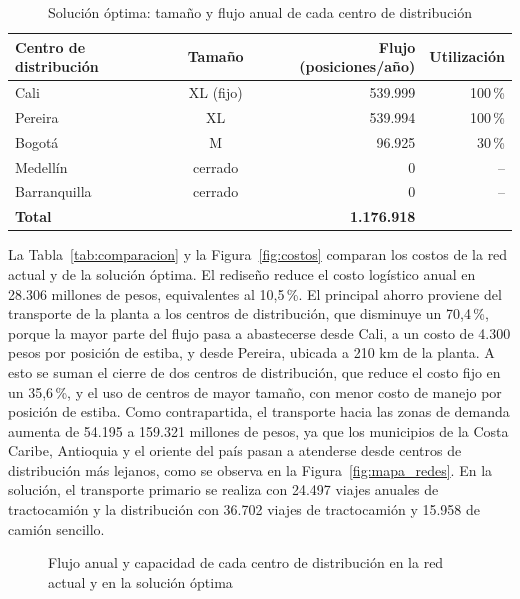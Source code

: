 \documentclass[fleqn, 11pt,letterpaper]{article}
\begin{document}
\begin{table}[H]
\centering
\caption{Solución óptima: tamaño y flujo anual de cada centro de distribución}
\label{tab:solucion_cedi}
\begin{tabular}{lcrr}
\toprule
\textbf{Centro de distribución} & \textbf{Tamaño} & \textbf{Flujo (posiciones/año)} & \textbf{Utilización} \\
\midrule
Cali         & XL (fijo) & 539.999 & 100\,\% \\
Pereira      & XL        & 539.994 & 100\,\% \\
Bogotá       & M         &  96.925 &  30\,\% \\
Medellín     & cerrado   &       0 & -- \\
Barranquilla & cerrado   &       0 & -- \\
\midrule
\textbf{Total} & & \textbf{1.176.918} & \\
\bottomrule
\end{tabular}
\end{table}

La Tabla~\ref{tab:comparacion} y la Figura~\ref{fig:costos} comparan los costos de la red actual y de la solución óptima. El rediseño reduce el costo logístico anual en 28.306 millones de pesos, equivalentes al 10,5\,\%. El principal ahorro proviene del transporte de la planta a los centros de distribución, que disminuye un 70,4\,\%, porque la mayor parte del flujo pasa a abastecerse desde Cali, a un costo de 4.300 pesos por posición de estiba, y desde Pereira, ubicada a 210 km de la planta. A esto se suman el cierre de dos centros de distribución, que reduce el costo fijo en un 35,6\,\%, y el uso de centros de mayor tamaño, con menor costo de manejo por posición de estiba. Como contrapartida, el transporte hacia las zonas de demanda aumenta de 54.195 a 159.321 millones de pesos, ya que los municipios de la Costa Caribe, Antioquia y el oriente del país pasan a atenderse desde centros de distribución más lejanos, como se observa en la Figura~\ref{fig:mapa_redes}. En la solución, el transporte primario se realiza con 24.497 viajes anuales de tractocamión y la distribución con 36.702 viajes de tractocamión y 15.958 de camión sencillo.


\begin{figure}[H]
    \centering
    
    \caption{Flujo anual y capacidad de cada centro de distribución en la red actual y en la solución óptima}
    \label{fig:uso_cedis}
\end{figure}
\end{document}
